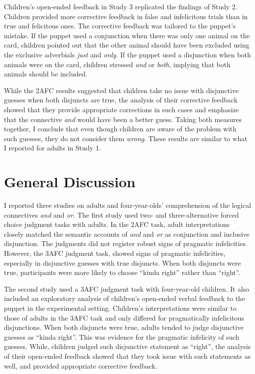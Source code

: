 \documentclass[oneside]{report}
\theoremstyle{definition}
\theoremstyle{definition}
\theoremstyle{definition}
\theoremstyle{remark}
\begin{document}
Children's open-ended feedback in Study 3 replicated the findings of
Study 2. Children provided more corrective feedback in false and
infelicitous trials than in true and felicitous ones. The corrective
feedback was tailored to the puppet's mistake. If the puppet used a
conjunction when there was only one animal on the card, children pointed
out that the other animal should have been excluded using the exclusive
adverbials \emph{just} and \emph{only}. If the puppet used a disjunction
when both animals were on the card, children stressed \emph{and} or
\emph{both}, implying that both animals should be included.

While the 2AFC results suggested that children take no issue with
disjunctive guesses when both disjuncts are true, the analysis of their
corrective feedback showed that they provide appropriate corrections in
such cases and emphasize that the connective \emph{and} would have been
a better guess. Taking both measures together, I conclude that even
though children are aware of the problem with such guesses, they do not
consider them \emph{wrong}. These results are similar to what I reported
for adults in Study 1.

\section{General Discussion}\label{general-discussion}

I reported three studies on adults and four-year-olds' comprehension of
the logical connectives \emph{and} and \emph{or}. The first study used
two- and three-alternative forced choice judgment tasks with adults. In
the 2AFC task, adult interpretations closely matched the semantic
accounts of \emph{and} and \emph{or} as conjunction and inclusive
disjunction. The judgments did not register robust signs of pragmatic
infelicities. However, the 3AFC judgment task, showed signs of pragmatic
infelicities, especially in disjunctive guesses with true disjuncts.
When both disjuncts were true, participants were more likely to choose
``kinda right'' rather than ``right''.

The second study used a 3AFC judgment task with four-year-old children.
It also included an exploratory analysis of children's open-ended verbal
feedback to the puppet in the experimental setting. Children's
interpretations were similar to those of adults in the 3AFC task and
only differed for pragmatically infelicitous disjunctions. When both
disjuncts were true, adults tended to judge disjunctive guesses as
``kinda right''. This was evidence for the pragmatic infelicity of such
guesses. While, children judged such disjunctive statement as ``right'',
the analysis of their open-ended feedback showed that they took issue
with such statements as well, and provided appropriate corrective
feedback.
\end{document}
